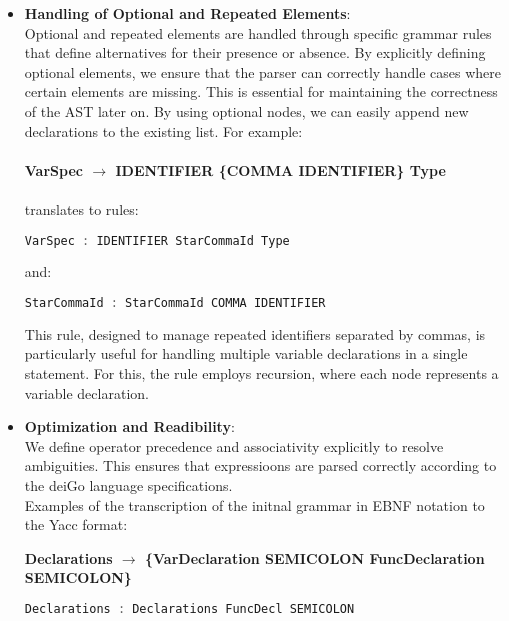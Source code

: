 \documentclass[12pt]{article}
\begin{document}
    \begin{itemize}
        \item \textbf{Handling of Optional and Repeated Elements}: \\ 
        Optional and repeated elements are handled through specific grammar rules that define alternatives for their presence or absence. By explicitly defining optional elements, we ensure that the parser can correctly handle cases where certain elements are missing. This is essential for maintaining the correctness of the AST later on.
        By using optional nodes, we can easily append new declarations 
        to the existing list. For example:\\ \\
        \small\textbf{VarSpec $\rightarrow$ IDENTIFIER \{COMMA IDENTIFIER\} Type}
        \\
        \\
        translates to rules:
        \begin{center}
            \begin{lstlisting}[language=C, basicstyle=\small\ttfamily]
VarSpec : IDENTIFIER StarCommaId Type
                \end{lstlisting}
            \end{center}
            and:
            \begin{center}
                \begin{lstlisting}[language=C, basicstyle=\small\ttfamily]
StarCommaId : StarCommaId COMMA IDENTIFIER
                \end{lstlisting}
            \end{center}


            This rule, designed to manage repeated identifiers 
            separated by commas, is particularly useful for handling 
            multiple variable declarations in a single statement. For this, 
            the rule employs recursion, where each node represents a variable 
            declaration.   
        \item \textbf{Optimization and Readibility}: \\ We define operator precedence and associativity explicitly to resolve ambiguities. This ensures that expressioons are parsed correctly according to the deiGo language specifications.
            \\Examples of the transcription of the initnal grammar in EBNF notation to the Yacc format:
            \begin{center}
                \small\textbf{Declarations $\rightarrow$ \{VarDeclaration SEMICOLON \textbar{} FuncDeclaration SEMICOLON\}}
                \begin{lstlisting}[language=C, basicstyle=\small\ttfamily]
Declarations : Declarations FuncDecl SEMICOLON


\end{lstlisting}
\end{center}
\end{itemize}
\end{document}
